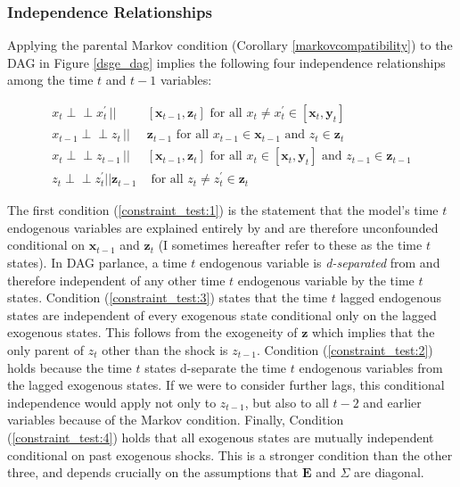 \documentclass{article}
\def\indep{\perp \!\!\! \perp}
\begin{document}
\subsubsection{Independence Relationships}

 Applying the parental Markov condition (Corollary \ref{markovcompatibility}) to the DAG in Figure \ref{dsge_dag} implies the following four independence relationships among the time $t$ and $t-1$ variables:

\begin{align}
  x_t \indep x^{\prime}_{t} \,||\,& [\mathbf{x}_{t-1},\mathbf{z}_t] \text{ for all } x_t \neq x^{\prime}_{t} \in [\mathbf{x}_t, \mathbf{y}_t] \label{constraint_test:1} \\
  x_{t-1} \indep z_{t} \,||\,& \mathbf{z}_{t-1} \text{ for all } x_{t-1} \in \mathbf{x}_{t-1} \text{ and } z_{t} \in \mathbf{z}_t \label{constraint_test:3} \\
  x_t \indep z_{t-1} \,||\,& [\mathbf{x}_{t-1}, \mathbf{z}_t] \text{ for all } x_t \in [\mathbf{x}_t, \mathbf{y}_t] \text{ and } z_{t-1} \in \mathbf{z}_{t-1} \label{constraint_test:2} \\
  z_t \indep z^{\prime}_{t} || \mathbf{z}_{t-1} & \text{ for all } z_t \not = z^{\prime}_{t} \in \mathbf{z}_t \label{constraint_test:4}
\end{align}

The first condition (\ref{constraint_test:1}) is the statement that the model's time $t$ endogenous variables are explained entirely by and are therefore unconfounded conditional on $\mathbf{x}_{t-1}$ and $\mathbf{z}_t$ (I sometimes hereafter refer to these as the time $t$ states). In DAG parlance, a time $t$ endogenous variable is \textit{d-separated} from and therefore independent of any other time $t$ endogenous variable by the time $t$ states. Condition (\ref{constraint_test:3}) states that the time $t$ lagged endogenous states are independent of every exogenous state conditional only on the lagged exogenous states. This follows from the exogeneity of $\mathbf{z}$ which implies that the only parent of $z_t$ other than the shock is $z_{t-1}$. Condition (\ref{constraint_test:2}) holds because the time $t$ states d-separate the time $t$ endogenous variables from the lagged exogenous states. If we were to consider further lags, this conditional independence would apply not only to $z_{t-1}$, but also to all $t-2$ and earlier variables because of the Markov condition. Finally, Condition (\ref{constraint_test:4}) holds that all exogenous states are mutually independent conditional on past exogenous shocks. This is a stronger condition than the other three, and depends crucially on the assumptions that $\mathbf{E}$ and $\Sigma$ are diagonal.
\end{document}
